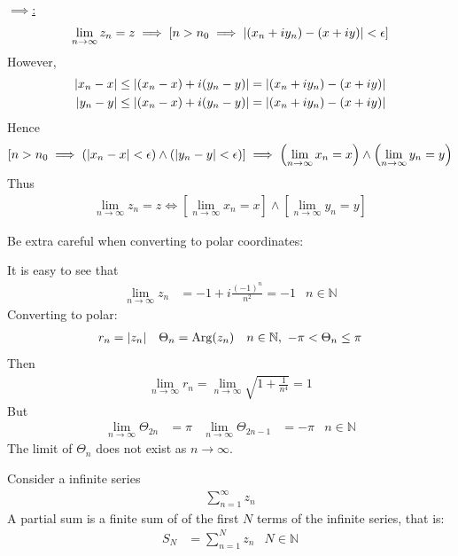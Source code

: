 \documentclass[12pt, english]{book}
\makeatletter
\renewenvironment{proof}[1][\proofname]{\par
	\pushQED{\qed}%
	\normalfont \topsep6\p@\@plus6\p@\relax
	\list{}{%
		\settowidth{\leftmargin}{\itshape\proofname:\hskip\labelsep}%
		\setlength{\labelwidth}{0pt}%
		\setlength{\itemindent}{-\leftmargin}%
	}%
	\item[\hskip\labelsep\itshape#1\@addpunct{:}]\ignorespaces
	}{ \popQED\endlist\@endpefalse}
\makeatother
\begin{document}
\begin{proof}
		\underline{\(\implies\):} 
		\begin{align*}
			\lim_{n \rightarrow \infty} z_n = z 
			\implies \left[n > n_0 \implies \abs{(x_n + iy_n) - (x + iy)} < \epsilon \right]
		\end{align*}
		However,
		\begin{align*}
			\abs{x_n - x} &\leq \abs{(x_n - x) + i(y_n - y)} = \abs{(x_n + iy_n) - (x + iy)}  \\
			\abs{y_n - y} &\leq \abs{(x_n - x) + i(y_n - y)} = \abs{(x_n + iy_n) - (x + iy)} 
		\end{align*}
		Hence 
		\begin{align*}
			\left[ 
			n > n_0 
			\implies\left(\abs{x_n - x} < \epsilon \right)
				\land \left(\abs{y_n - y} < \epsilon \right)
			\right]
			\implies \left(\lim_{n \rightarrow \infty} x_n = x \right)
				\land \left(\lim_{n \rightarrow \infty} y_n = y \right)
		\end{align*}
		Thus 
		\begin{align*}
			\lim_{n \rightarrow \infty} z_n = z 
			\iff \left[\lim_{n \rightarrow \infty} x_n = x \right] \land 
			\left[\lim_{n \rightarrow \infty} y_n = y \right] 
		\end{align*}
	\end{proof}

	Be extra careful when converting to polar coordinates:
	\begin{example}
		It is easy to see that 
		\begin{align*}
			\lim_{n \rightarrow \infty}
			z_n &= -1 + i \frac{(-1)^n}{n^2} = -1 & n \in \mathbb{N}
		\end{align*}
		Converting to polar: 
		\begin{align*}
			r_n &= \abs{z_n} & \Theta_n &= \operatorname{Arg}(z_n) 
				& n \in \mathbb{N}, \ -\pi < \Theta_n \leq \pi
		\end{align*}
		Then 
		\begin{align*}
			\lim_{n \rightarrow \infty} r_n = \lim_{n \rightarrow \infty} \sqrt{1 + \frac{1}{n^4}} = 1
		\end{align*}
		But
		\begin{align*}
			\lim_{n \rightarrow \infty} \Theta_{2n} &= \pi &
			\lim_{n \rightarrow \infty} \Theta_{2n-1} &= -\pi
				& n \in \mathbb{N}
		\end{align*}
		The limit of \(\Theta_n\) does not exist as \(n \rightarrow \infty\).
	\end{example}

	\begin{definition}
		\label{Partial Sum (Series) Definition - Complex}
		Consider a infinite series
		\begin{align*}
			\sum_{n=1}^{\infty} z_n
		\end{align*}
		A partial sum is a finite sum of of the first \(N\) terms of the infinite series, that is:
		\begin{align*}
			S_N &= \sum_{n=1}^{N} z_n & N \in \mathbb{N}
		\end{align*}
	\end{definition}
	
\end{document}
